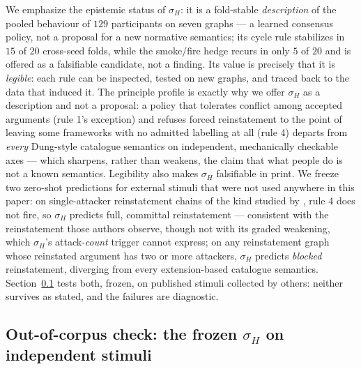 \documentclass[review,12pt]{elsarticle}
\theoremstyle{definition}
\theoremstyle{remark}
\begin{document}
We emphasize the epistemic status of $\sigma_H$: it is a fold-stable
\emph{description} of the pooled behaviour of $129$ participants on seven
graphs --- a learned consensus policy, not a proposal for a new normative
semantics; its cycle rule stabilizes in $15$ of $20$ cross-seed folds, while
the smoke/fire hedge recurs in only $5$ of $20$ and is offered as a
falsifiable candidate, not a finding. Its value
is precisely that it is \emph{legible}: each rule can be inspected, tested on
new graphs, and traced back to the data that induced it. The principle
profile is exactly why we offer $\sigma_H$ as a description and not a
proposal: a policy that tolerates conflict among accepted arguments (rule
1's exception) and refuses forced reinstatement to the point of leaving some
frameworks with no admitted labelling at all (rule 4) departs from
\emph{every} Dung-style catalogue semantics on independent, mechanically
checkable axes --- which sharpens, rather than weakens, the claim that what
people do is not a known semantics. Legibility also
makes $\sigma_H$ falsifiable in print. We freeze two zero-shot predictions
for external stimuli that were not used anywhere in this paper: on
single-attacker reinstatement chains of the kind studied by
\citet{rahwan2010}, rule 4 does not fire, so $\sigma_H$ predicts full,
committal reinstatement --- consistent with the reinstatement those authors
observe, though not with its graded weakening, which $\sigma_H$'s
attack-\emph{count} trigger cannot express; on any reinstatement graph whose
reinstated argument has two or more attackers, $\sigma_H$ predicts
\emph{blocked} reinstatement, diverging from every extension-based catalogue
semantics. Section~\ref{sec:zeroshot} tests both, frozen, on published
stimuli collected by others: neither survives as stated, and the failures
are diagnostic.

\subsection{Out-of-corpus check: the frozen $\sigma_H$ on independent stimuli}
\label{sec:zeroshot}
\end{document}
